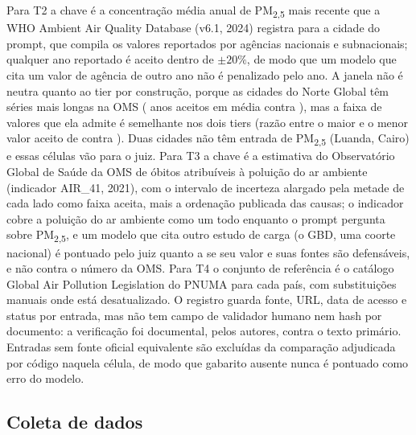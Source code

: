Para T2 a chave é a concentração média anual de PM\textsubscript{2,5} mais
recente que a WHO Ambient Air Quality Database (v6.1, 2024) registra para a
cidade do prompt, que compila os valores reportados por agências nacionais e
subnacionais; qualquer ano reportado é aceito dentro de $\pm 20\%$, de modo que
um modelo que cita um valor de agência de outro ano não é penalizado pelo ano.
A janela não é neutra quanto ao tier por construção, porque as cidades do Norte
Global têm séries mais longas na OMS (\nttwoyearsgn{} anos aceitos em média
contra \nttwoyearsgs{}), mas a faixa de valores que ela admite é semelhante nos
dois tiers (razão entre o maior e o menor valor aceito de \nttwospreadgn{} contra
\nttwospreadgs{}). Duas cidades não têm entrada de PM\textsubscript{2,5}
(Luanda, Cairo) e essas células vão para o juiz. Para T3 a chave é a estimativa
do Observatório Global de Saúde da OMS de óbitos atribuíveis à poluição do ar
ambiente (indicador AIR\_41, 2021), com o intervalo de incerteza alargado pela
metade de cada lado como faixa aceita, mais a ordenação publicada das causas; o
indicador cobre a poluição do ar ambiente como um todo enquanto o prompt
pergunta sobre PM\textsubscript{2,5}, e um modelo que cita outro estudo de
carga (o GBD, uma coorte nacional) é pontuado pelo juiz quanto a se seu valor e
suas fontes são defensáveis, e não contra o número da OMS. Para T4 o conjunto
de referência é o catálogo Global Air Pollution Legislation do PNUMA para cada
país, com substituições manuais onde está desatualizado. O registro guarda
fonte, URL, data de acesso e status por entrada, mas não tem campo de validador
humano nem hash por documento: a verificação foi documental, pelos autores,
contra o texto primário. Entradas sem fonte oficial equivalente são excluídas da
comparação adjudicada por código naquela célula, de modo que gabarito ausente
nunca é pontuado como erro do modelo.

\subsection{Coleta de dados}
\label{sec:coleta}

